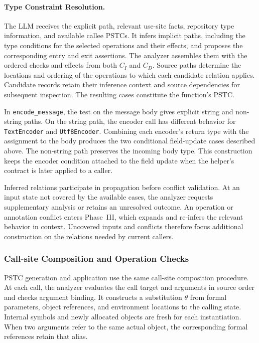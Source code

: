 \paragraph{Type Constraint Resolution.}
The LLM receives the explicit path, relevant use-site facts, repository
type information, and available callee PSTCs. It infers implicit paths,
including the type conditions for the selected operations and their
effects, and proposes the corresponding entry and exit assertions.
The analyzer assembles them with the ordered checks and effects from both
$C_I$ and $C_D$. Source paths determine the locations and ordering of the
operations to which each candidate relation applies. Candidate records
retain their inference context and source dependencies for subsequent
inspection. The resulting cases constitute the function's PSTC.

In \texttt{encode\_message}, the test on the message body gives explicit
string and non-string paths. On the string path, the encoder call has
different behavior for \texttt{TextEncoder} and \texttt{Utf8Encoder}.
Combining each encoder's return type with the assignment to the body
produces the two conditional field-update cases described above. The
non-string path preserves the incoming body type. This construction keeps
the encoder condition attached to the field update when the helper's
contract is later applied to a caller.

Inferred relations participate in propagation before conflict validation.
At an input state not covered by the available cases, the analyzer requests
supplementary analysis or retains an unresolved outcome. An operation or
annotation conflict enters Phase~III, which expands and re-infers the
relevant behavior in context. Uncovered inputs and conflicts therefore
focus additional construction on the relations needed by current callers.

\subsubsection{Call-site Composition and Operation Checks}
\label{sec:composition}
PSTC generation and application use the same call-site composition
procedure. At each call, the analyzer evaluates the call target and arguments in
source order and checks argument binding. It constructs a substitution
$\theta$ from formal parameters, object references, and environment
locations to the calling state. Internal symbols and newly allocated
objects are fresh for each instantiation. When two arguments refer to the
same actual object, the corresponding formal references retain that alias.

